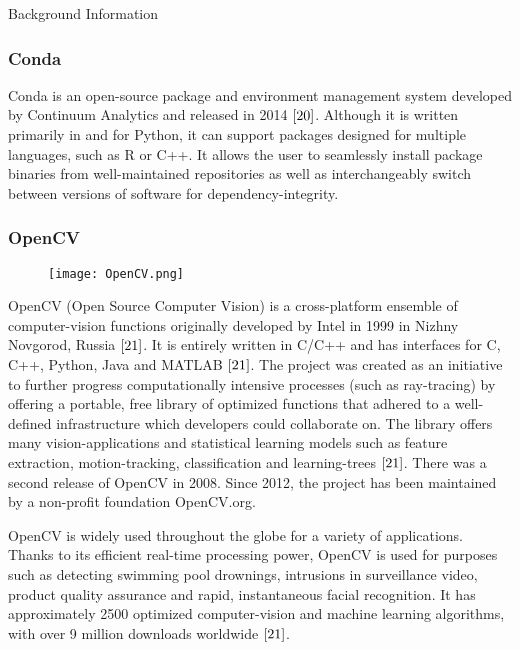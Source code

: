 \documentclass[a4paper,12pt]{article}
\begin{document}
\begin{section}{Background Information}
\subsubsection{Conda}

Conda is an open-source package and environment management system developed by Continuum Analytics and released in 2014 $\cite{20}$. Although it is written primarily in and for Python, it can support packages designed for multiple languages, such as R or C++. It allows the user to seamlessly install package binaries from well-maintained repositories as well as interchangeably switch between versions of software for dependency-integrity. 

\subsubsection{OpenCV}

\begin{wrapfigure}{L}{0.2\textwidth}
\begin{center}
\centering
\texttt{[image: OpenCV.png]}
\end{center}
\end{wrapfigure}


OpenCV (Open Source Computer Vision) is a cross-platform ensemble of computer-vision functions originally developed by Intel in 1999 in Nizhny Novgorod, Russia $\cite{21}$. It is entirely written in C/C++ and has interfaces for C, C++, Python, Java and MATLAB $\cite{21}$. The project was created as an initiative to further progress computationally intensive processes (such as ray-tracing) by offering a portable, free library of optimized functions that adhered to a well-defined infrastructure which developers could collaborate on. The library offers many vision-applications and statistical learning models such as feature extraction, motion-tracking, classification and learning-trees $\cite{21}$. There was a second release of OpenCV in 2008. Since 2012, the project has been maintained by a non-profit foundation OpenCV.org. 

OpenCV is widely used throughout the globe for a variety of applications. Thanks to its efficient real-time processing power, OpenCV is used for purposes such as detecting swimming pool drownings, intrusions in surveillance video, product quality assurance and rapid, instantaneous facial recognition. It has approximately 2500 optimized computer-vision and machine learning algorithms, with over 9 million downloads worldwide $\cite{21}$.


\end{section}
\end{document}
